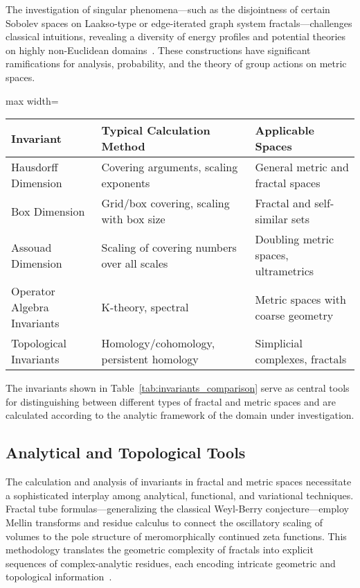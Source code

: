 The investigation of singular phenomena—such as the disjointness of certain Sobolev spaces on Laakso-type or edge-iterated graph system fractals—challenges classical intuitions, revealing a diversity of energy profiles and potential theories on highly non-Euclidean domains~\cite{ref30,ref35}. These constructions have significant ramifications for analysis, probability, and the theory of group actions on metric spaces.

\begin{table*}[htbp]
\centering
\caption{Key Invariants Across Metric Spaces and Their Calculation Methods}
\label{tab:invariants_comparison}
\begin{adjustbox}{max width=\textwidth}
\begin{tabular}{lll}
\toprule
\textbf{Invariant} & \textbf{Typical Calculation Method} & \textbf{Applicable Spaces} \\
\midrule
Hausdorff Dimension & Covering arguments, scaling exponents & General metric and fractal spaces \\
Box Dimension & Grid/box covering, scaling with box size & Fractal and self-similar sets \\
Assouad Dimension & Scaling of covering numbers over all scales & Doubling metric spaces, ultrametrics \\
Operator Algebra Invariants & K-theory, spectral & Metric spaces with coarse geometry \\
Topological Invariants & Homology/cohomology, persistent homology & Simplicial complexes, fractals \\
\bottomrule
\end{tabular}
\end{adjustbox}
\end{table*}

The invariants shown in Table~\ref{tab:invariants_comparison} serve as central tools for distinguishing between different types of fractal and metric spaces and are calculated according to the analytic framework of the domain under investigation.

\subsection{Analytical and Topological Tools}

The calculation and analysis of invariants in fractal and metric spaces necessitate a sophisticated interplay among analytical, functional, and variational techniques. Fractal tube formulas—generalizing the classical Weyl-Berry conjecture—employ Mellin transforms and residue calculus to connect the oscillatory scaling of volumes to the pole structure of meromorphically continued zeta functions. This methodology translates the geometric complexity of fractals into explicit sequences of complex-analytic residues, each encoding intricate geometric and topological information~\cite{ref21,ref33}.

